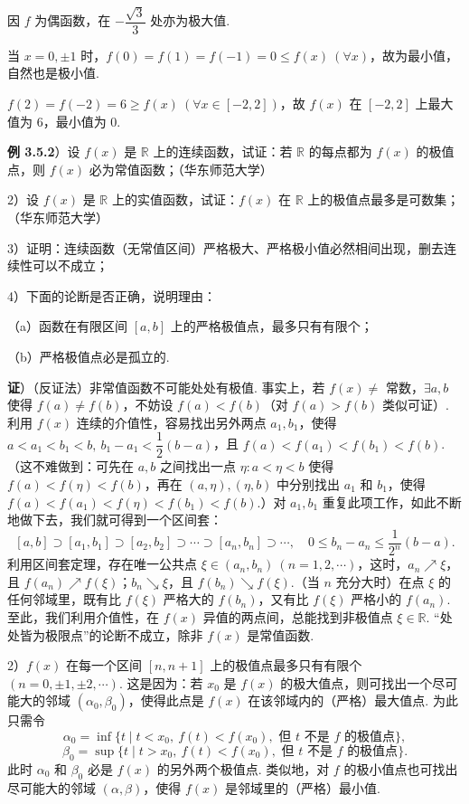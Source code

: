 \documentclass[UTF8, 12pt, fontset=fandol, oneside]{ctexart}
\begin{document}
因 $f$ 为偶函数，在 $-\dfrac{\sqrt3}{3}$ 处亦为极大值.

当 $x=0,\pm1$ 时，$f(0)=f(1)=f(-1)=0\le f(x)\ (\forall x)$，故为最小值，自然也是极小值.

$f(2)=f(-2)=6\ge f(x)\ (\forall x\in[-2,2])$，故 $f(x)$ 在 $[-2,2]$ 上最大值为 6，最小值为 0.

\noindent\textbf{例 3.5.2}）设 $f(x)$ 是 $\mathbb R$ 上的连续函数，试证：若 $\mathbb R$ 的每点都为 $f(x)$ 的极值点，则 $f(x)$ 必为常值函数；（华东师范大学）

2）设 $f(x)$ 是 $\mathbb R$ 上的实值函数，试证：$f(x)$ 在 $\mathbb R$ 上的极值点最多是可数集；（华东师范大学）

3）证明：连续函数（无常值区间）严格极大、严格极小值必然相间出现，删去连续性可以不成立；

4）下面的论断是否正确，说明理由：

（a）函数在有限区间 $[a,b]$ 上的严格极值点，最多只有有限个；

（b）严格极值点必是孤立的.

\noindent\textbf{证}）（反证法）非常值函数不可能处处有极值. 事实上，若 $f(x)\ne$ 常数，$\exists a,b$ 使得 $f(a)\ne f(b)$，不妨设 $f(a)<f(b)$（对 $f(a)>f(b)$ 类似可证）. 利用 $f(x)$ 连续的介值性，容易找出另外两点 $a_1,b_1$，使得 $a<a_1<b_1<b,\ b_1-a_1<\dfrac12(b-a)$，且 $f(a)<f(a_1)<f(b_1)<f(b)$.（这不难做到：可先在 $a,b$ 之间找出一点 $\eta:a<\eta<b$ 使得 $f(a)<f(\eta)<f(b)$，再在 $(a,\eta),(\eta,b)$ 中分别找出 $a_1$ 和 $b_1$，使得 $f(a)<f(a_1)<f(\eta)<f(b_1)<f(b)$.）对 $a_1,b_1$ 重复此项工作，如此不断地做下去，我们就可得到一个区间套：
\[
  [a,b]\supset[a_1,b_1]\supset[a_2,b_2]\supset\cdots\supset[a_n,b_n]\supset\cdots,\quad
  0\le b_n-a_n\le\frac1{2^n}(b-a).
\]
利用区间套定理，存在唯一公共点 $\xi\in(a_n,b_n)\ (n=1,2,\cdots)$，这时，$a_n\nearrow\xi$，且 $f(a_n)\nearrow f(\xi)$；$b_n\searrow\xi$，且 $f(b_n)\searrow f(\xi)$.（当 $n$ 充分大时）在点 $\xi$ 的任何邻域里，既有比 $f(\xi)$ 严格大的 $f(b_n)$，又有比 $f(\xi)$ 严格小的 $f(a_n)$. 至此，我们利用介值性，在 $f(x)$ 异值的两点间，总能找到非极值点 $\xi\in\mathbb R$. “处处皆为极限点”的论断不成立，除非 $f(x)$ 是常值函数.

2）$f(x)$ 在每一个区间 $[n,n+1]$ 上的极值点最多只有有限个 $(n=0,\pm1,\pm2,\cdots)$. 这是因为：若 $x_0$ 是 $f(x)$ 的极大值点，则可找出一个尽可能大的邻域 $(\alpha_0,\beta_0)$，使得此点是 $f(x)$ 在该邻域内的（严格）最大值点. 为此只需令
\[
  \alpha_0=\inf\{t\mid t<x_0,\ f(t)<f(x_0),\text{ 但 }t\text{ 不是 }f\text{ 的极值点}\},
\]
\[
  \beta_0=\sup\{t\mid t>x_0,\ f(t)<f(x_0),\text{ 但 }t\text{ 不是 }f\text{ 的极值点}\}.
\]
此时 $\alpha_0$ 和 $\beta_0$ 必是 $f(x)$ 的另外两个极值点. 类似地，对 $f$ 的极小值点也可找出尽可能大的邻域 $(\alpha,\beta)$，使得 $f(x)$ 是邻域里的（严格）最小值.
\end{document}
